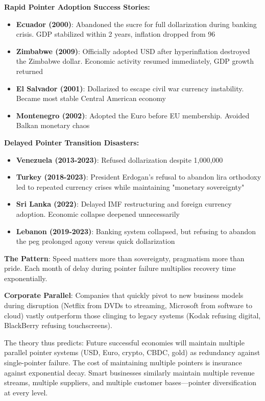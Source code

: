 \documentclass[11pt,oneside]{book}
\begin{document}
\textbf{Rapid Pointer Adoption Success Stories:}
\begin{itemize}
\item \textbf{Ecuador (2000)}: Abandoned the sucre for full dollarization during banking crisis. GDP stabilized within 2 years, inflation dropped from 96%
\item \textbf{Zimbabwe (2009)}: Officially adopted USD after hyperinflation destroyed the Zimbabwe dollar. Economic activity resumed immediately, GDP growth returned
\item \textbf{El Salvador (2001)}: Dollarized to escape civil war currency instability. Became most stable Central American economy
\item \textbf{Montenegro (2002)}: Adopted the Euro before EU membership. Avoided Balkan monetary chaos
\end{itemize}

\textbf{Delayed Pointer Transition Disasters:}
\begin{itemize}
\item \textbf{Venezuela (2013-2023)}: Refused dollarization despite 1,000,000%
\item \textbf{Turkey (2018-2023)}: President Erdogan's refusal to abandon lira orthodoxy led to repeated currency crises while maintaining "monetary sovereignty"
\item \textbf{Sri Lanka (2022)}: Delayed IMF restructuring and foreign currency adoption. Economic collapse deepened unnecessarily
\item \textbf{Lebanon (2019-2023)}: Banking system collapsed, but refusing to abandon the peg prolonged agony versus quick dollarization
\end{itemize}

\textbf{The Pattern}: Speed matters more than sovereignty, pragmatism more than pride. Each month of delay during pointer failure multiplies recovery time exponentially.

\textbf{Corporate Parallel}: Companies that quickly pivot to new business models during disruption (Netflix from DVDs to streaming, Microsoft from software to cloud) vastly outperform those clinging to legacy systems (Kodak refusing digital, BlackBerry refusing touchscreens).

The theory thus predicts: Future successful economies will maintain multiple parallel pointer systems (USD, Euro, crypto, CBDC, gold) as redundancy against single-pointer failure. The cost of maintaining multiple pointers is insurance against exponential decay. Smart businesses similarly maintain multiple revenue streams, multiple suppliers, and multiple customer bases—pointer diversification at every level.
\end{document}
